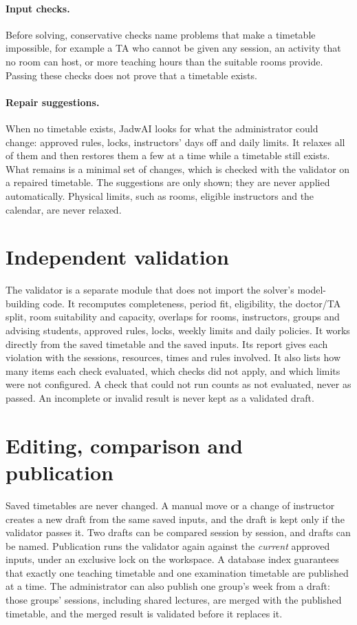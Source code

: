 \paragraph{Input checks.} Before solving, conservative checks name problems that make a timetable impossible, for example a TA who cannot be given any session, an activity that no room can host, or more teaching hours than the suitable rooms provide. Passing these checks does not prove that a timetable exists.

\paragraph{Repair suggestions.} When no timetable exists, JadwAI looks for what the administrator could change: approved rules, locks, instructors' days off and daily limits. It relaxes all of them and then restores them a few at a time while a timetable still exists. What remains is a minimal set of changes, which is checked with the validator on a repaired timetable. The suggestions are only shown; they are never applied automatically. Physical limits, such as rooms, eligible instructors and the calendar, are never relaxed.

\section{Independent validation}

The validator is a separate module that does not import the solver's model-building code. It recomputes completeness, period fit, eligibility, the doctor/TA split, room suitability and capacity, overlaps for rooms, instructors, groups and advising students, approved rules, locks, weekly limits and daily policies. It works directly from the saved timetable and the saved inputs. Its report gives each violation with the sessions, resources, times and rules involved. It also lists how many items each check evaluated, which checks did not apply, and which limits were not configured. A check that could not run counts as not evaluated, never as passed. An incomplete or invalid result is never kept as a validated draft.

\section{Editing, comparison and publication}

Saved timetables are never changed. A manual move or a change of instructor creates a new draft from the same saved inputs, and the draft is kept only if the validator passes it. Two drafts can be compared session by session, and drafts can be named. Publication runs the validator again against the \emph{current} approved inputs, under an exclusive lock on the workspace. A database index guarantees that exactly one teaching timetable and one examination timetable are published at a time. The administrator can also publish one group's week from a draft: those groups' sessions, including shared lectures, are merged with the published timetable, and the merged result is validated before it replaces it.


